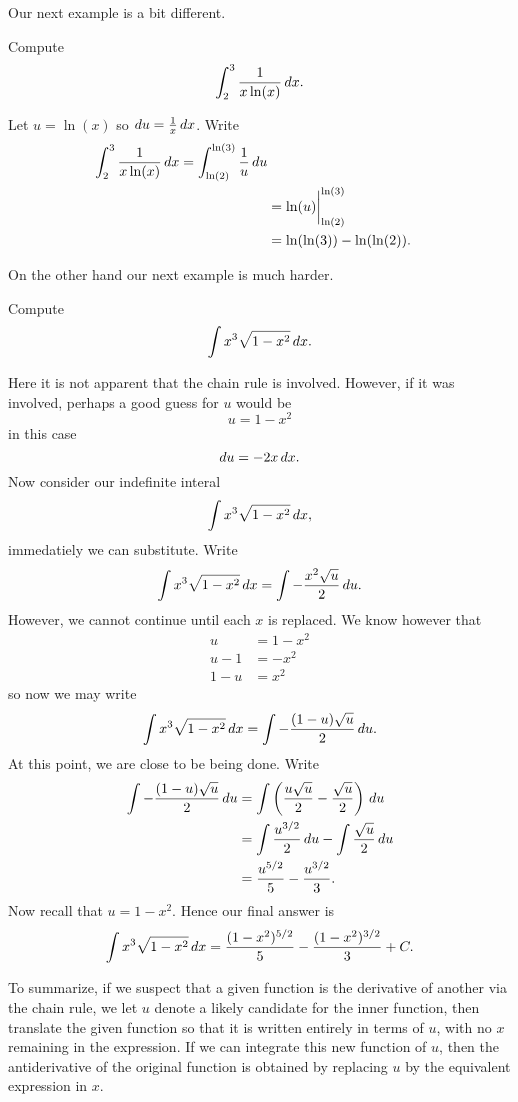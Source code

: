 Our next example is a bit different.

\begin{example}
Compute
\[
\int_{2}^{3} \frac{1}{x\ln(x)} \, d x.
\]
\end{example}

\begin{solution}
Let $u=\ln(x)$ so $du=\frac{1}{x}\, d x$. Write
\begin{align*}
\int_{2}^{3} \frac{1}{x\ln(x)} \, d x = \int_{\ln(2)}^{\ln(3)} \frac{1}{u} \, d u\\
&= \ln(u) \bigg|_{\ln(2)}^{\ln(3)}\\
& = \ln(\ln(3)) - \ln(\ln(2)).
\end{align*}
\end{solution}


On the other hand our next example is much harder.

\begin{example} Compute
\[
\int x^3\sqrt{1-x^2}\, d x.
\]
\end{example}

\begin{solution} 
Here it is not apparent that the chain rule is involved. However, if
it was involved, perhaps a good guess for $u$ would be
\[
u = 1-x^2
\]
in this case
\[
du = -2x \, d x.
\]
Now consider our indefinite interal
\[
\int x^3\sqrt{1-x^2}\, d x,
\]
immedatiely we can substitute. Write
\[
\int x^3\sqrt{1-x^2}\, d x = \int -\frac{x^2\sqrt{u}}{2}\, d u.
\]
However, we cannot continue until each $x$ is replaced. We know however that 
\begin{align*}
u &= 1-x^2 \\
u -1 &= -x^2\\
1- u &= x^2
\end{align*}
so now we may write
\[
\int x^3\sqrt{1-x^2}\, d x = \int -\frac{(1-u)\sqrt{u}}{2}\, d u.
\]
At this point, we are close to be being done. Write
\begin{align*}
\int -\frac{(1-u)\sqrt{u}}{2}\, d u &= \int \left(\frac{u\sqrt{u}}{2} - \frac{\sqrt{u}}{2}\right) \, d u \\
&= \int \frac{u^{3/2}}{2} \, d u - \int \frac{\sqrt{u}}{2} \, d u \\
&= \frac{u^{5/2}}{5} - \frac{u^{3/2}}{3}.
\end{align*}
Now recall that $u = 1-x^2$. Hence our final answer is
\[
\int x^3\sqrt{1-x^2}\, d x = \frac{(1-x^2)^{5/2}}{5} - \frac{(1-x^2)^{3/2}}{3}+C.
\]
\end{solution}

To summarize, if we suspect that a given function is the derivative of
another via the chain rule, we let $u$ denote a likely candidate for
the inner function, then translate the given function so that it is
written entirely in terms of $u$, with no $x$ remaining in the
expression. If we can integrate this new function of $u$, then the
antiderivative of the original function is obtained by replacing $u$
by the equivalent expression in $x$.



